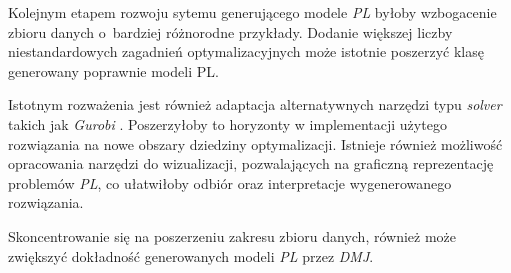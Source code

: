 Kolejnym etapem rozwoju sytemu generującego modele \textit{PL} byłoby wzbogacenie zbioru danych o~bardziej różnorodne przykłady. Dodanie większej liczby niestandardowych zagadnień optymalizacyjnych może istotnie poszerzyć klasę generowany poprawnie modeli PL.

Istotnym rozważenia jest również adaptacja alternatywnych narzędzi typu \textit{solver} takich jak \textit{Gurobi} \cite{gurobi2023}. Poszerzyłoby to horyzonty w implementacji użytego rozwiązania na nowe obszary dziedziny optymalizacji. Istnieje również możliwość opracowania narzędzi do wizualizacji, pozwalających na graficzną reprezentację problemów \textit{PL}, co ułatwiłoby odbiór oraz interpretacje wygenerowanego rozwiązania. 

Skoncentrowanie się na poszerzeniu zakresu zbioru danych, również może zwiększyć dokładność generowanych modeli \textit{PL} przez \textit{DMJ}. 